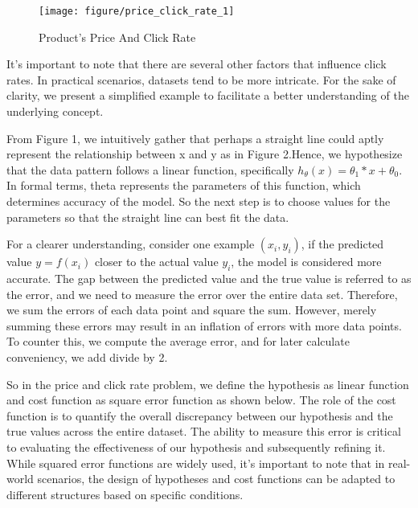\documentclass{article}
\begin{document}
     \begin{figure}[htbp]
        \centering
        \texttt{[image: figure/price\_click\_rate\_1]}
        \caption{Product's Price And Click Rate}
     \end{figure}

     It's important to note that there are several other factors that influence click rates. In practical scenarios, datasets tend to be more intricate. For the sake of clarity, we present a simplified example to facilitate a better understanding of the underlying concept.

     From Figure 1,  we intuitively gather that perhaps a straight line could aptly represent the relationship between x and y as in Figure 2.Hence, we hypothesize that the data pattern follows a linear function, specifically $ h_\theta(x) = \theta_{1} * x  + \theta_{0}$. In formal terms, theta represents the parameters of this function, which determines accuracy of the model.  So the next step is to choose values for the parameters so that the straight line can best fit the data.



     For a clearer understanding, consider one example $(x_{i}, y_{i})$,   if the predicted value $y = f(x_{i})$ closer to the actual value $y_{i}$, the model is considered more accurate. The gap between the predicted value and the true value is referred to as the error, and we need to measure the error over the entire data set. Therefore, we sum the errors of each data point and square the sum. However, merely summing these errors may result in an inflation of errors with more data points. To counter this, we compute the average error, and for later calculate conveniency, we add divide by 2.

     So in the price and click rate problem, we define the hypothesis as linear function and cost function as square error function as shown below. The role of the cost function is to quantify the overall discrepancy between our hypothesis and the true values across the entire dataset. The ability to measure this error is critical to evaluating the effectiveness of our hypothesis and subsequently refining it. While squared error functions are widely used, it's important to note that in real-world scenarios, the design of hypotheses and cost functions can be adapted to different structures based on specific conditions.

     \hspace*{\fill}
\end{document}
